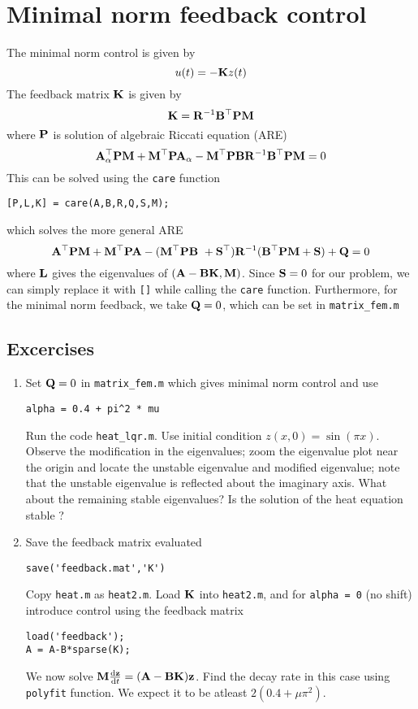 \documentclass[12pt]{article}
\begin{document}
\section{Minimal norm feedback control}
The minimal norm control is given by
\[
u(t) = - {\mathbf K} z (t)
\]
The feedback matrix ${\mathbf K}$ is given by
\[
{\mathbf K} = {\mathbf R}^{-1} {\mathbf B}^\top {\mathbf P} {\mathbf M}
\]
where ${\mathbf P}$ is solution of algebraic Riccati equation (ARE)
\[
{\mathbf A}^\top_\alpha {\mathbf P} {\mathbf M} + {\mathbf M}^\top {\mathbf P} {\mathbf A}_\alpha - {\mathbf M}^\top {\mathbf P} {\mathbf B} {\mathbf R}^{-1} {\mathbf B}^\top {\mathbf P} {\mathbf M}  = 0
\]
This can be solved using the {\tt care} function
\begin{lstlisting}
[P,L,K] = care(A,B,R,Q,S,M);
\end{lstlisting}
which solves the more general ARE
\[
{\mathbf A}^\top {\mathbf P} {\mathbf M} + {\mathbf M}^\top {\mathbf P} {\mathbf A} - ({\mathbf M}^\top {\mathbf P} {\mathbf B} \ + {\mathbf S}^\top)  {\mathbf R}^{-1} ({\mathbf B}^\top {\mathbf P} {\mathbf M} +{\mathbf S}) + {\mathbf Q} = 0
\]
where ${\mathbf L}$ gives the eigenvalues of $({\mathbf A}- {\mathbf B} {\mathbf K},{\mathbf M})$. Since ${\mathbf S}=0$ for our problem, we can simply replace it with {\tt []} while calling the {\tt care} function. Furthermore, for the minimal norm feedback, we take ${\mathbf Q}=0$, which can be set in {\tt matrix\_fem.m}
\subsection{Excercises}

\begin{enumerate}
\item Set ${\mathbf Q}=0$ in {\tt matrix\_fem.m} which gives minimal norm control and use
\begin{lstlisting}
alpha = 0.4 + pi^2 * mu
\end{lstlisting}
Run the code {\tt heat\_lqr.m}. Use initial condition $z(x,0) = \sin(\pi x)$. Observe the modification in the eigenvalues; zoom the eigenvalue plot near the origin and locate the unstable eigenvalue and modified eigenvalue; note that the unstable eigenvalue is reflected about the imaginary axis. What about the remaining stable eigenvalues? Is the solution of the heat equation stable ?

\item Save the feedback matrix evaluated
\begin{lstlisting}
save('feedback.mat','K')
\end{lstlisting}
Copy {\tt heat.m} as {\tt heat2.m}. Load ${\mathbf K}$ into {\tt heat2.m}, and for {\tt alpha = 0} (no shift) introduce control using the feedback matrix
\begin{lstlisting}
load('feedback');
A = A-B*sparse(K);
\end{lstlisting}
We now solve ${\mathbf M} \frac{\textrm{d} {\mathbf z}}{\textrm{d} t}=({\mathbf A} - {\mathbf B}{\mathbf K}){\mathbf z}$. Find the decay rate in this case using {\tt polyfit} function. We expect it to be atleast $2(0.4 + \mu \pi^2)$.

\end{enumerate}
\end{document}
